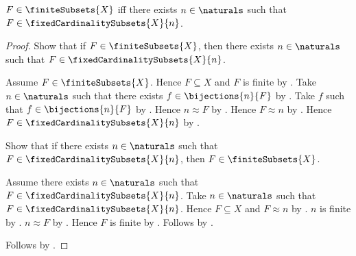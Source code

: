 \begin{proposition}\label{finite_subset_fixed_cardinality_characterization}
    $F\in\finiteSubsets{X}$ iff there exists $n\in\naturals$ such that
        $F\in\fixedCardinalitySubsets{X}{n}$.
\end{proposition}
\begin{proof}
    Show that if $F\in\finiteSubsets{X}$, then there exists
        $n\in\naturals$ such that
            $F\in\fixedCardinalitySubsets{X}{n}$.
    \begin{subproof}
        Assume $F\in\finiteSubsets{X}$.
        Hence $F\subseteq X$ and $F$ is finite by
            .
        Take $n\in\naturals$ such that there exists
            $f\in\bijections{n}{F}$ by .
        Take $f$ such that $f\in\bijections{n}{F}$ by \auto.
        Hence $n\approx F$ by .
        Hence $F\approx n$ by .
        Hence $F\in\fixedCardinalitySubsets{X}{n}$ by
            .
    \end{subproof}
    Show that if there exists $n\in\naturals$ such that
            $F\in\fixedCardinalitySubsets{X}{n}$, then
        $F\in\finiteSubsets{X}$.
    \begin{subproof}
        Assume there exists $n\in\naturals$ such that
            $F\in\fixedCardinalitySubsets{X}{n}$.
        Take $n\in\naturals$ such that
            $F\in\fixedCardinalitySubsets{X}{n}$.
        Hence $F\subseteq X$ and $F\approx n$ by
            .
        $n$ is finite by .
        $n\approx F$ by .
        Hence $F$ is finite by .
        Follows by .
    \end{subproof}
    Follows by \auto.
\end{proof}
